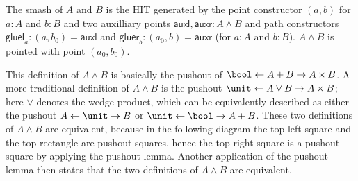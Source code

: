 \documentclass{article}
\newcommand{\smsh}{\wedge}
\newcommand{\auxl}{\mathsf{auxl}}
\newcommand{\auxr}{\mathsf{auxr}}
\newcommand{\gluel}{\mathsf{gluel}}
\newcommand{\gluer}{\mathsf{gluer}}
\begin{document}
\begin{defn}
  The smash of $A$ and $B$ is the HIT generated by the point constructor $(a,b)$ for $a:A$ and $b:B$
  and two auxilliary points $\auxl,\auxr:A\smsh B$ and path constructors $\gluel_a:(a,b_0)=\auxl$
  and $\gluer_b:(a_0,b)=\auxr$ (for $a:A$ and $b:B$). $A\smsh B$ is pointed with point $(a_0,b_0)$.
\end{defn}
\begin{rmk}
  This definition of $A\smsh B$ is basically the pushout of
  $\bool\leftarrow A+B\to A \times B$.  A more traditional definition of $A\smsh B$ is the pushout
  $\unit\leftarrow A\vee B\to A \times B$; here $\vee$ denotes the wedge product, which can be
  equivalently described as either the pushout $A\leftarrow \unit\to B$ or
  $\unit\leftarrow \bool\to A + B$. These two definitions of $A\smsh B$ are equivalent, because in
  the following diagram the top-left square and the top rectangle are pushout squares, hence the
  top-right square is a pushout square by applying the pushout lemma. Another application of the
  pushout lemma then states that the two definitions of $A\smsh B$ are equivalent.
\begin{center}
\end{center}

\end{rmk}
\end{document}
